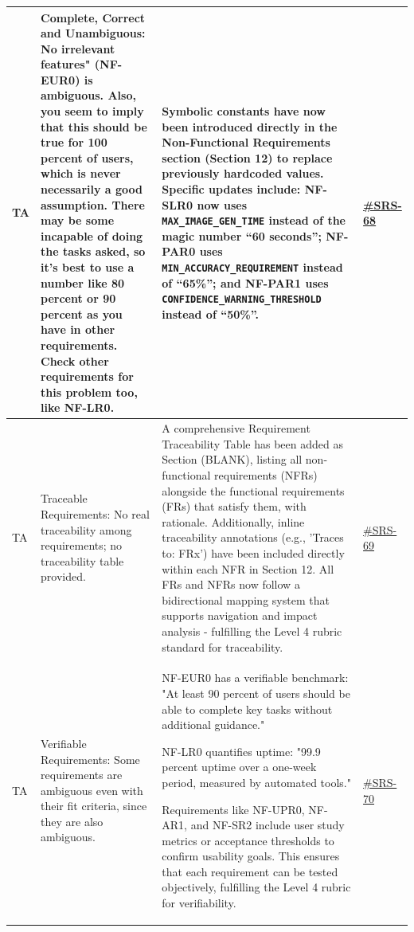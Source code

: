 \documentclass{article}
\begin{document}
\begin{longtable}{|p{1.48cm}|p{5cm}|p{4.7cm}|p{1cm}|}
TA & Complete, Correct and Unambiguous: No irrelevant features" (NF-EUR0) is ambiguous. Also, you seem to imply that this should be true for 100 percent of users, which is never necessarily a good assumption. There may be some incapable of doing the tasks asked, so it's best to use a number like 80 percent or 90 percent as you have in other requirements. Check other requirements for this problem too, like NF-LR0. & Symbolic constants have now been introduced directly in the Non-Functional Requirements section (Section 12) to replace previously hardcoded values. Specific updates include: \textbf{NF-SLR0} now uses \texttt{MAX\_IMAGE\_GEN\_TIME} instead of the magic number ``60 seconds''; \textbf{NF-PAR0} uses \texttt{MIN\_ACCURACY\_REQUIREMENT} instead of ``65\%''; and \textbf{NF-PAR1} uses \texttt{CONFIDENCE\_WARNING\_THRESHOLD} instead of ``50\%''.
&\href{https://github.com/harrisonchiu/xray/issues/68}{\#SRS-68} \\
\hline

TA & Traceable Requirements: No real traceability among requirements; no traceability table provided. & A comprehensive Requirement Traceability Table has been added as Section (BLANK), listing all non-functional requirements (NFRs) alongside the functional requirements (FRs) that satisfy them, with rationale. Additionally, inline traceability annotations (e.g., 'Traces to: FRx') have been included directly within each NFR in Section 12.
All FRs and NFRs now follow a bidirectional mapping system that supports navigation and impact analysis - fulfilling the Level 4 rubric standard for traceability. &\href{https://github.com/harrisonchiu/xray/issues/69}{\#SRS-69} \\
\hline

TA & Verifiable Requirements: Some requirements are ambiguous even with their fit criteria, since they are also ambiguous. & NF-EUR0 has a verifiable benchmark: "At least 90 percent of users should be able to complete key tasks without additional guidance."

NF-LR0 quantifies uptime: "99.9 percent uptime over a one-week period, measured by automated tools."

Requirements like NF-UPR0, NF-AR1, and NF-SR2 include user study metrics or acceptance thresholds to confirm usability goals. This ensures that each requirement can be tested objectively, fulfilling the Level 4 rubric for verifiability. &\href{https://github.com/harrisonchiu/xray/issues/70}{\#SRS-70} \\
\hline


\end{longtable}
\end{document}
